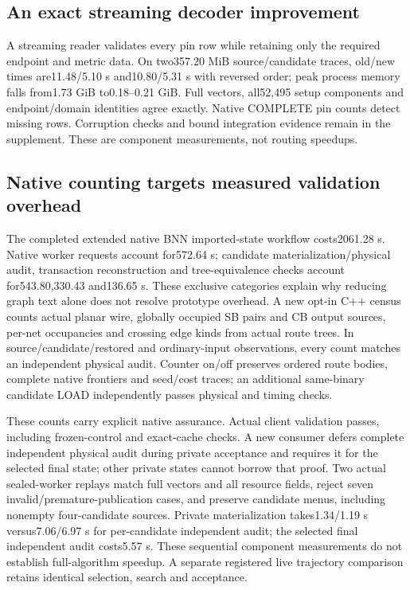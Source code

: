 \documentclass[conference,10pt]{IEEEtran}
\begin{document}
\subsection{An exact streaming decoder improvement}
A streaming reader validates every pin row while retaining only the required endpoint and metric data. On two357.20 MiB source/candidate traces, old/new times are11.48/5.10 s and10.80/5.31 s with reversed order; peak process memory falls from1.73 GiB to0.18--0.21 GiB. Full vectors, all52,495 setup components and endpoint/domain identities agree exactly. Native COMPLETE pin counts detect missing rows. Corruption checks and bound integration evidence remain in the supplement. These are component measurements, not routing speedups.

\subsection{Native counting targets measured validation overhead}
The completed extended native BNN imported-state workflow costs2061.28 s. Native worker requests account for572.64 s; candidate materialization/physical audit, transaction reconstruction and tree-equivalence checks account for543.80,330.43 and136.65 s. These exclusive categories explain why reducing graph text alone does not resolve prototype overhead. A new opt-in C++ census counts actual planar wire, globally occupied SB pairs and CB output sources, per-net occupancies and crossing edge kinds from actual route trees. In source/candidate/restored and ordinary-input observations, every count matches an independent physical audit. Counter on/off preserves ordered route bodies, complete native frontiers and seed/cost traces; an additional same-binary candidate LOAD independently passes physical and timing checks.

These counts carry explicit native assurance. Actual client validation passes, including frozen-control and exact-cache checks. A new consumer defers complete independent physical audit during private acceptance and requires it for the selected final state; other private states cannot borrow that proof. Two actual sealed-worker replays match full vectors and all resource fields, reject seven invalid/premature-publication cases, and preserve candidate menus, including nonempty four-candidate sources. Private materialization takes1.34/1.19 s versus7.06/6.97 s for per-candidate independent audit; the selected final independent audit costs5.57 s. These sequential component measurements do not establish full-algorithm speedup. A separate registered live trajectory comparison retains identical selection, search and acceptance.
\end{document}
